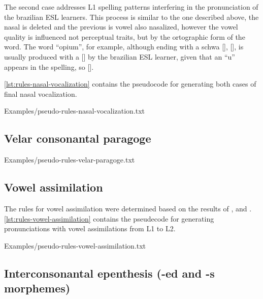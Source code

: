The second case addresses L1 spelling patterns interfering in the pronunciation of the brazilian \ac{ESL} learners. This process
is similar to the one described above, the nasal is deleted and the previous is vowel also nasalized, however the vowel quality is 
influenced not perceptual traits, but by the ortographic form of the word. The word ``opium'', for example, although ending
with a schwa [], [], is usually produced with a [] by the brazilian \ac{ESL} learner, given that an ``u''
appears in the spelling, so [].

\autoref{lst:rules-nasal-vocalization} contains the pseudocode for generating both cases of final nasal vocalization.

%
    {Examples/pseudo-rules-nasal-vocalization.txt}
    
\subsection{Velar consonantal paragoge}

%
    {Examples/pseudo-rules-velar-paragoge.txt}

\subsection{Vowel assimilation}

The rules for vowel assimilation were determined based on the results of
\citeauthor{Battistela2010} \citep{Battistela2010}, \citeauthor{Rauber2005} \citep{Rauber2005} and \citeauthor{Rauber2006} \citep{Rauber2006}.
\autoref{lst:rules-vowel-assimilation} contains the pseudecode for generating pronunciations with vowel assimilations from L1 to L2.

%
    {Examples/pseudo-rules-vowel-assimilation.txt}


\subsection{Interconsonantal epenthesis (-ed and -s morphemes)}






